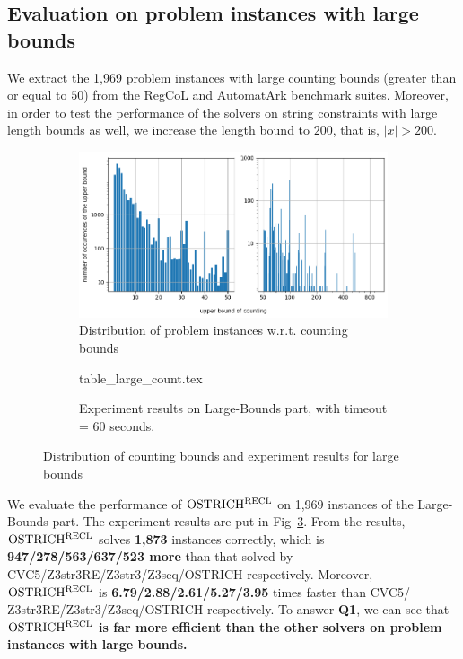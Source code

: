 \subsection{Evaluation on problem instances with large bounds}\label{subsec:large_bounds_eval}
%
We extract the 1,969 problem instances with large counting bounds (greater than or equal to $50$) from the RegCoL and AutomatArk benchmark suites.  
Moreover, in order to test the performance of the solvers on string constraints with large length bounds as well, we increase the length bound to $200$, that is, $|x| > 200$.
%
\begin{figure}[ht]
  \centering
  \begin{subfigure}[t]{0.49\textwidth}
    \centering\vskip 0pt
    \includegraphics[width=1\textwidth]{counting_distribution.png}  
    \caption{Distribution of problem instances w.r.t. counting bounds}  
    \label{fig:count_distri}
  \end{subfigure}
  \hfill
  \begin{subfigure}[t]{0.49\textwidth}
    \centering\vskip 0pt
    {table_large_count.tex}
    \caption{Experiment results on Large-Bounds part, with timeout = 60 seconds.}
    \label{fig:table_large_count}
  \end{subfigure}
  \caption{Distribution of counting bounds and experiment results for large bounds}
\end{figure}

We evaluate the performance of $\rm OSTRICH^{RECL}$ on 1,969 instances of the Large-Bounds part. 
The experiment results are put in Fig~\ref{fig:table_large_count}. From the results, $\rm OSTRICH^{RECL}$ solves \textbf{1,873} instances correctly, which is \textbf{947/278/563/637/523 more} than that solved by CVC5/Z3str3RE/Z3str3/Z3seq/OSTRICH respectively. Moreover, $\rm OSTRICH^{RECL}$ is \textbf{ 6.79/2.88/2.61/5.27/3.95} times faster than CVC5/ Z3str3RE/Z3str3/Z3seq/OSTRICH respectively. To answer \textbf{Q1}, we can see that $\rm OSTRICH^{RECL}$ \textbf{is far more efficient than the other solvers on problem instances with large bounds.}

